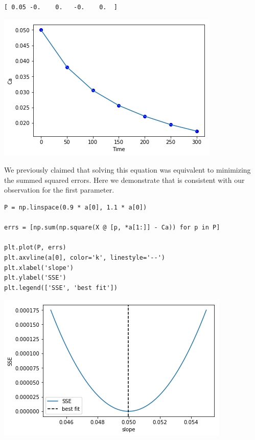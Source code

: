 \documentclass[11pt]{article}
\begin{document}
\begin{verbatim}
[ 0.05 -0.    0.   -0.    0.  ]

\end{verbatim}




\begin{center}
\includegraphics[width=.9\linewidth]{obipy-resources/d00b1703e45a1bb2f86b06f32bba01b8-19673Slr.png}
\end{center}


We previously claimed that solving this equation was equivalent to minimizing the summed squared errors. Here we demonstrate that is consistent with our observation for the first parameter.

\begin{verbatim}
P = np.linspace(0.9 * a[0], 1.1 * a[0])

errs = [np.sum(np.square(X @ [p, *a[1:]] - Ca)) for p in P]

plt.plot(P, errs)
plt.axvline(a[0], color='k', linestyle='--')
plt.xlabel('slope')
plt.ylabel('SSE')
plt.legend(['SSE', 'best fit'])
\end{verbatim}

\begin{center}
\includegraphics[width=.9\linewidth]{obipy-resources/d00b1703e45a1bb2f86b06f32bba01b8-19673fvx.png}
\end{center}
\end{document}
